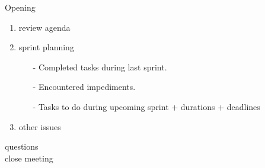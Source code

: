\documentclass[pdftex, 12pt, a4paper]{report}
\begin{document}
\pagestyle{fancy}

Opening

\begin{enumerate}
\item review agenda			
\item sprint planning
\begin{enumerate}
\item[-] Completed tasks during last sprint.
\item[-] Encountered impediments.
\item[-] Tasks to do during upcoming sprint + durations + deadlines
\end{enumerate}
\item other issues
\end{enumerate}

questions\\

close meeting
\end{document}
